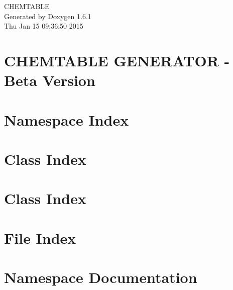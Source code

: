 \documentclass[a4paper]{book}
\begin{document}
\hypersetup{pageanchor=false}
\begin{titlepage}
\vspace*{7cm}
\begin{center}
{\Large CHEMTABLE }\\
\vspace*{1cm}
{\large Generated by Doxygen 1.6.1}\\
\vspace*{0.5cm}
{\small Thu Jan 15 09:36:50 2015}\\
\end{center}
\end{titlepage}
\clearemptydoublepage
{}
\tableofcontents
\clearemptydoublepage
{}
\hypersetup{pageanchor=true}
\chapter{CHEMTABLE GENERATOR -\/ Beta Version}
\label{index}\hypertarget{index}{}
\chapter{Namespace Index}

\chapter{Class Index}

\chapter{Class Index}

\chapter{File Index}

\chapter{Namespace Documentation}




\end{document}
